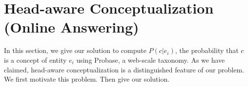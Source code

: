 \section{Head-aware Conceptualization (Online Answering)}
\label{sec:conceptualization}
In this section, we give our solution to compute $P(c|e_i)$, the probability that $c$ is a concept of entity $e_i$ using \ac{Probase}, a web-scale taxonomy.
As we have claimed, head-aware conceptualization is a distinguished feature of our problem.
We first motivate this problem. Then give our solution.

%
%
%


